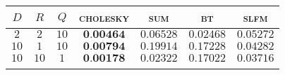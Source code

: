 
\begin{tabular}{|ccc|cccc|}
  \hline
  \abovespace\belowspace
  $D$ & $R$ & $Q$ & \textsc{cholesky} & \textsc{sum} & \textsc{bt} & \textsc{slfm}\\
\hline
  \abovespace
 $ 2 $ & $ 2 $ & $ 10 $ & $ \textbf{0.00464} $ & $ 0.06528 $ & $ 0.02468 $ & $ 0.05272 $ \\ 
 $ 10 $ & $ 1 $ & $ 10 $ & $ \textbf{0.00794} $ & $ 0.19914 $ & $ 0.17228 $ & $ 0.04282 $ \\ 
 $ 10 $ & $ 10 $ & $ 1 $ & $ \textbf{0.00178} $ & $ 0.02322 $ & $ 0.17022 $ & $ 0.03716 $ \\ 

  \belowspace \\

  \hline
\end{tabular}
